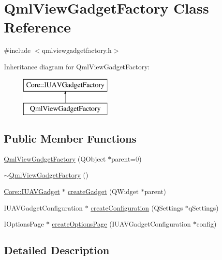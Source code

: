 \hypertarget{class_qml_view_gadget_factory}{\section{\-Qml\-View\-Gadget\-Factory \-Class \-Reference}
\label{class_qml_view_gadget_factory}
}


{\ttfamily \#include $<$qmlviewgadgetfactory.\-h$>$}

\-Inheritance diagram for \-Qml\-View\-Gadget\-Factory\-:\begin{figure}[H]
\begin{center}
\leavevmode
\includegraphics[height=2.000000cm]{class_qml_view_gadget_factory}
\end{center}
\end{figure}
\subsection*{\-Public \-Member \-Functions}
\begin{DoxyCompactItemize}
\item 
\hyperlink{group___o_p_map_plugin_ga84b7aa224d691ff4283bf3201a8f3b5e}{\-Qml\-View\-Gadget\-Factory} (\-Q\-Object $\ast$parent=0)
\item 
\hyperlink{group___o_p_map_plugin_ga2ae87f4b2a912a2e38fe69c6b8b3e3e7}{$\sim$\-Qml\-View\-Gadget\-Factory} ()
\item 
\hyperlink{class_core_1_1_i_u_a_v_gadget}{\-Core\-::\-I\-U\-A\-V\-Gadget} $\ast$ \hyperlink{group___o_p_map_plugin_gadceaaa6e9f968a951f33f6c1a7de1340}{create\-Gadget} (\-Q\-Widget $\ast$parent)
\item 
\-I\-U\-A\-V\-Gadget\-Configuration $\ast$ \hyperlink{group___o_p_map_plugin_ga9000c14dd19e5dbc8e5c8e2ed26b2553}{create\-Configuration} (\-Q\-Settings $\ast$q\-Settings)
\item 
\-I\-Options\-Page $\ast$ \hyperlink{group___o_p_map_plugin_gab0af6f5774c846fe82b1b073cf0bbb76}{create\-Options\-Page} (\-I\-U\-A\-V\-Gadget\-Configuration $\ast$config)
\end{DoxyCompactItemize}


\subsection{\-Detailed \-Description}


